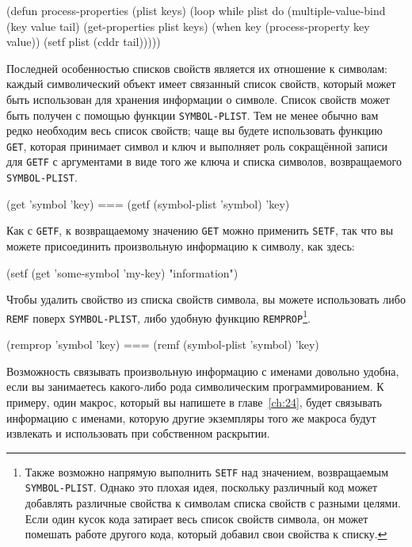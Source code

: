 \begin{myverb}
(defun process-properties (plist keys)
  (loop while plist do
	(multiple-value-bind (key value tail) (get-properties plist keys)
	  (when key (process-property key value))
	  (setf plist (cddr tail)))))
\end{myverb}

Последней особенностью списков свойств является их отношение к символам: каждый
символический объект имеет связанный список свойств, который может быть использован для
хранения информации о символе. Список свойств может быть получен с помощью функции
\lstinline{SYMBOL-PLIST}. Тем не менее обычно вам редко необходим весь список свойств; чаще вы
будете использовать функцию \lstinline{GET}, которая принимает символ и ключ и выполняет роль
сокращённой записи для \lstinline{GETF} с аргументами в виде того же ключа и списка символов,
возвращаемого \lstinline{SYMBOL-PLIST}.

\begin{myverb}
(get 'symbol 'key) === (getf (symbol-plist 'symbol) 'key)
\end{myverb}

Как с \lstinline{GETF}, к возвращаемому значению \lstinline{GET} можно применить \lstinline{SETF}, так
что вы можете присоединить произвольную информацию к символу, как здесь:

\begin{myverb}
(setf (get 'some-symbol 'my-key) "information")
\end{myverb}

Чтобы удалить свойство из списка свойств символа, вы можете использовать либо \lstinline{REMF}
поверх \lstinline{SYMBOL-PLIST}, либо удобную функцию \lstinline{REMPROP}\footnote{Также возможно
  напрямую выполнить \lstinline{SETF} над значением, возвращаемым \lstinline{SYMBOL-PLIST}. Однако
  это плохая идея, поскольку различный код может добавлять различные свойства к символам
  списка свойств с разными целями. Если один кусок кода затирает весь список свойств
  символа, он может помешать работе другого кода, который добавил свои свойства к списку.}.

\begin{myverb}
(remprop 'symbol 'key) === (remf (symbol-plist 'symbol) 'key)
\end{myverb}

Возможность связывать произвольную информацию с именами довольно удобна, если вы
занимаетесь какого-либо рода символическим программированием. К примеру, один макрос,
который вы напишете в главе~\ref{ch:24}, будет связывать информацию с именами, которую
другие экземпляры того же макроса будут извлекать и использовать при собственном
раскрытии.

